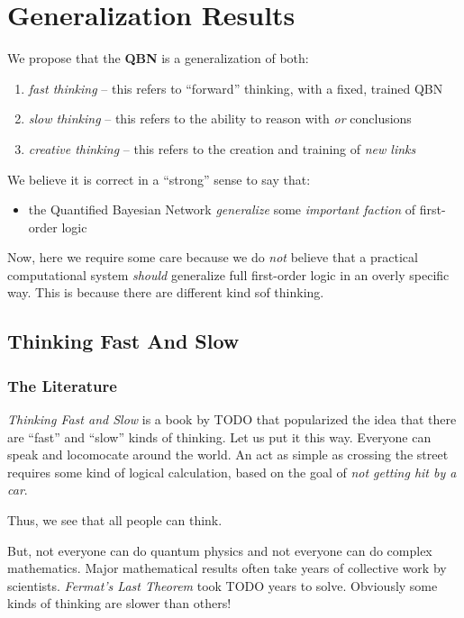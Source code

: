 \documentclass[12pt]{article}
\begin{document}
\section{Generalization Results}
We propose that the {\bf QBN} is a generalization of both:
\begin{enumerate}
    \item {\em fast thinking} -- this refers to ``forward'' thinking, with a fixed, trained QBN
    \item {\em slow thinking} -- this refers to the ability to reason with {\em or} conclusions
    \item {\em creative thinking} -- this refers to the creation and training of {\em new links}
\end{enumerate}

We believe it is correct in a ``strong'' sense to say that:
\begin{itemize}
    \item the Quantified Bayesian Network {\em generalize} some {\em important faction} of first-order logic
\end{itemize}

Now, here we require some care because we do {\em not} believe that a practical computational system {\em should} generalize full first-order logic in an overly specific way.
This is because there are different kind sof thinking.

\subsection{Thinking Fast And Slow}
\subsubsection{The Literature}
{\em Thinking Fast and Slow} is a book by TODO that popularized the idea that there are ``fast'' and ``slow'' kinds of thinking.
Let us put it this way.
Everyone can speak and locomocate around the world.
An act as simple as crossing the street requires some kind of logical calculation, based on the goal of {\em not getting hit by a car}.

Thus, we see that all people can think.


But, not everyone can do quantum physics and not everyone can do complex mathematics.
Major mathematical results often take years of collective work by scientists.
{\em Fermat's Last Theorem} took TODO years to solve.
Obviously some kinds of thinking are slower than others!
\end{document}
